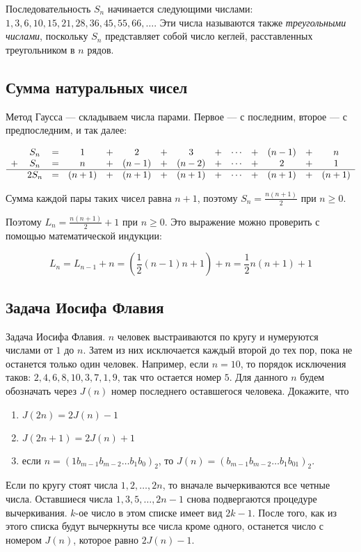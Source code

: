 Последовательность $S_n$ начинается следующими числами: $1, 3, 6, 10, 15, 21, 28, 36, 45, 55, 66, \ldots$.
Эти числа называются также \emph{треугольными числами}, поскольку $S_n$ представляет собой
число кеглей, расставленных треугольником в $n$ рядов.

\subsection{Сумма натуральных чисел}

Метод Гаусса --- складываем числа парами. Первое --- с последним, второе --- с предпоследним,
и так далее:

\begin{equation}
\begin{array}{cccccccccccccc}
  & S_n & = & 1 & + & 2 & + & 3 & + & \cdots & + & (n-1) & + & n \\
+ & S_n & = & n & + & (n-1) & + & (n-2) & + & \cdots & + & 2 & + & 1 \\
\hline
  & 2S_n & = & (n+1) & + & (n+1) & + & (n+1) & + & \cdots & + & (n+1) & + & (n+1)
\end{array}
\end{equation}

Сумма каждой пары таких чисел равна $n+1$, поэтому $S_n = \frac{n(n+1)}{2}$ при $n \ge 0$.

Поэтому $L_n = \frac{n(n+1)}{2} + 1$ при $n \ge 0$.
Это выражение можно проверить с помощью математической индукции:

$$
L_n = L_{n-1} + n = \left(\frac{1}{2}(n-1)n+1 \right)+n = \frac{1}{2}n(n+1) + 1
$$

\subsection{Задача Иосифа Флавия}

Задача Иосифа Флавия. $n$ человек выстраиваются по кругу и нумеруются числами от $1$ до $n$. Затем из них исключается каждый второй до тех пор, пока не останется только один человек. Например, если $n = 10$, то порядок исключения таков: $2, 4, 6, 8, 10, 3, 7, 1, 9$, так что остается номер $5$. Для данного $n$ будем обозначать через $J(n)$ номер последнего оставшегося человека. Докажите, что 
  \begin{enumerate}
    \item $J(2n) = 2J(n) - 1$
    \item $J(2n + 1) = 2J(n) + 1$
    \item если $n = (1b_{m - 1}b_{m - 2}\ldots b_1b_0)_2$, то $J(n) = (b_{m - 1}b_{m - 2}\ldots b_1b_01)_2$. 

  \end{enumerate}

Если по кругу стоят числа $1, 2, \ldots, 2n$, то вначале вычеркиваются все четные числа. 
Оставшиеся числа $1, 3, 5, \ldots, 2n - 1$ снова подвергаются процедуре вычеркивания. $k$-ое число в этом 
списке имеет вид $2k - 1$. После того, как из этого списка будут вычеркнуты все числа кроме одного, 
останется число с номером $J(n)$, которое равно $2J(n) - 1$. 

